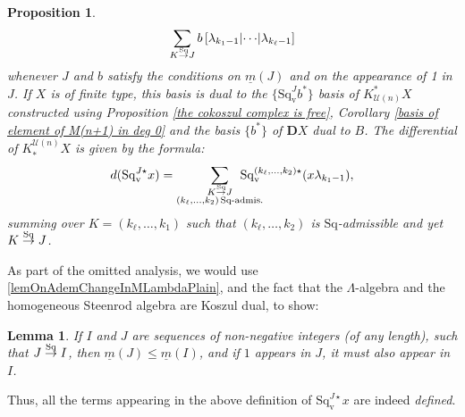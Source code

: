 \documentclass[11pt]{amsart} \renewcommand{\baselinestretch}{1.2}
\theoremstyle{plain}
\newtheorem{lem}[thm]{Lemma}
\newtheorem{prop}[thm]{Proposition}
\theoremstyle{definition}
\newcommand{\calU}{\mathcal{U}}
\newcommand{\minDimSq}{\underline{m}}
\newcommand{\produces}[3]{#3:#1\sim #2}
\renewcommand{\produces}[3]{#1\rightarrow_{#3} #2}%
\renewcommand{\produces}[3]{#1\overset{\smash{#3}}{\rightarrow} #2}%
\newcommand{\Sq}{\mathrm{Sq}}
\newcommand{\dver}{_\mathrm{v}}
\newcommand{\Sqv}{\mathrm{Sq}\dver}
\newcommand{\Sqvstar}[1]{\mathrm{Sq}\dver^{#1\star}}
\newcommand{\dual}{\mathbf{D}}
\begin{document}
\begin{Koszul complexes}
\begin{prop}
\[\sum_{\produces{K}{J}{\Sq}}b\left[\lambda_{k_1-1} \middle|\cdots\middle|\lambda_{k_\ell-1} \right]\]
whenever $J$ and $b$ satisfy the conditions on $\minDimSq(J)$ and on the appearance of 1 in $J$.
If $X$ is  of finite type, this basis is dual to the $\{\Sqv^Jb^*\}$ basis of $K^*_{\calU(n)}X$   constructed using Proposition \ref{the cokoszul complex is free}, Corollary \ref{basis of element of M(n+1) in deg 0} and the basis $\{b^*\}$  of $\dual X$ dual to $B$. The differential of $K^{\calU(n)}_*X$ is given by the formula:
\[d(\Sqvstar{J}x)=\sum_{ \substack{\produces{K}{J}{\Sq}\\(k_{\ell},\ldots,k_2){\,\Sq\textup{-admis.}}}}\!\!\!\!\!\!\!\!\!\!\!\! \Sqvstar{(k_{\ell},\ldots,k_2)}(x\lambda_{k_1-1}),\]
summing over $K=(k_{\ell},\ldots,k_1)$ such that $(k_{\ell},\ldots,k_2)$ is $\Sq$-admissible %
and yet $\produces{K}{J}{\Sq}$.
\end{prop}
\noindent As part of the omitted analysis, we would use \ref{lemOnAdemChangeInMLambdaPlain}, and the fact that the $\Lambda$-algebra and the homogeneous Steenrod algebra are Koszul dual, to show:
\begin{lem}
If $I$ and $J$ are sequences of non-negative integers (of any length), such that $\produces{J}{I}{\Sq}$, then $\minDimSq(J)\leq\minDimSq(I)$, and if $1$ appears in $J$, it must also appear in $I$.
\end{lem}
\noindent Thus, all the terms appearing in the above definition of $\Sqvstar{J}x$ are indeed \emph{defined}.

\end{Koszul complexes}
\end{document}

